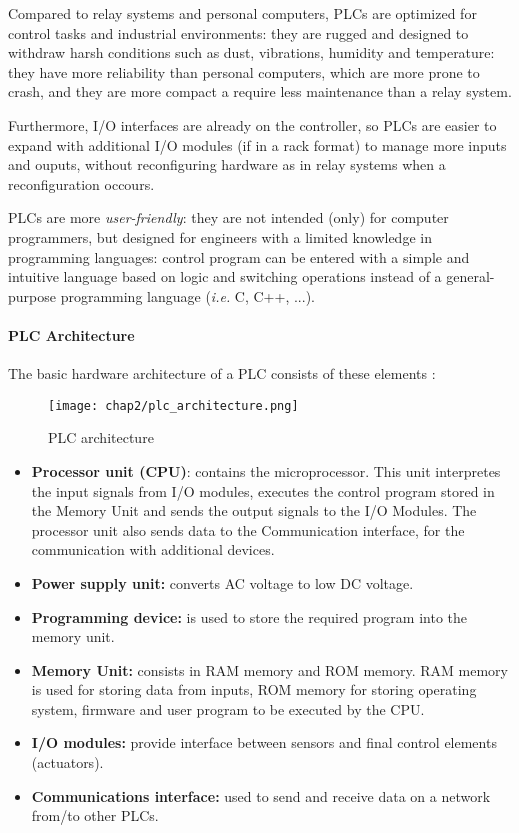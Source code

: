 \bigskip
Compared to relay systems and personal computers, PLCs are optimized for control tasks and industrial environments: they are rugged and designed to withdraw harsh conditions such as dust, vibrations, humidity and temperature: they have more reliability than personal computers, which are more prone to crash, and they are more compact a require less maintenance than a relay system.

Furthermore, I/O interfaces are already on the controller, so PLCs are easier to expand with additional I/O modules (if in a rack format) to manage more inputs and ouputs, without reconfiguring hardware as in relay systems when a reconfiguration occours. 

\bigskip
PLCs are more \textit{user-friendly}: they are not intended (only) for computer programmers, but designed for engineers with a limited knowledge in programming languages: control program can be entered with a simple and intuitive language based on logic and switching operations instead of a general-purpose programming language (\textit{i.e.} C, C++, ...). 

\paragraph{PLC Architecture}
The basic hardware architecture of a PLC consists of these elements \cite{plc_book}:

\begin{figure}[ht]
	\centering
	\texttt{[image: chap2/plc\_architecture.png]}
	\caption{PLC architecture}
	\label{fig:PLC_architecture}
\end{figure}

\begin{itemize}
	\item \textbf{Processor unit (CPU)}: contains the microprocessor. This unit interpretes the input signals from I/O modules, executes the control program stored in the Memory Unit and sends the output signals to the I/O Modules.
	The processor unit also sends data to the Communication interface, for the communication with additional devices.
	
	\item \textbf{Power supply unit:} converts AC voltage to low DC voltage.
	
	\item \textbf{Programming device:} is used to store the required program into the memory unit.
	
	\item \textbf{Memory Unit:} consists in RAM memory and ROM memory. RAM memory is used for storing data from inputs, ROM memory for storing operating system, firmware and user program to be executed by the CPU.
	
	\item \textbf{I/O modules:} provide interface between sensors and final control elements (actuators).
	
	\item \textbf{Communications interface:} used to send and receive data on a network from/to other PLCs.
\end{itemize}

